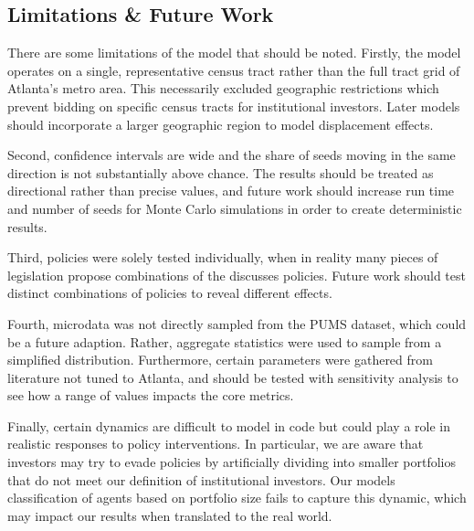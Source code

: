 \documentclass[twocolumn,showpacs,%
  nofootinbib,aps,superscriptaddress,%
  eqsecnum,prd,notitlepage,showkeys,10pt]{revtex4-1}
\begin{document}
\subsection{Limitations \& Future Work}

There are some limitations of the model that should be noted. Firstly, the model operates on a single, representative census tract rather than the full tract grid of Atlanta's metro area. This necessarily excluded geographic restrictions which prevent bidding on specific census tracts for institutional investors. Later models should incorporate a larger geographic region to model displacement effects. \newline

Second, confidence intervals are wide and the share of seeds moving in the same direction is not substantially above chance. The results should be treated as directional rather than precise values, and future work should increase run time and number of seeds for Monte Carlo simulations in order to create deterministic results.\newline

Third, policies were solely tested individually, when in reality many pieces of legislation propose combinations of the discusses policies. Future work should test distinct combinations of policies to reveal different effects. \newline

Fourth, microdata was not directly sampled from the PUMS dataset, which could be a future adaption. Rather, aggregate statistics were used to sample from a simplified distribution. Furthermore, certain parameters were gathered from literature not tuned to Atlanta, and should be tested with sensitivity analysis to see how a range of values impacts the core metrics. \newline

Finally, certain dynamics are difficult to model in code but could play a role in realistic responses to policy interventions. In particular, we are aware that investors may try to evade policies by artificially dividing into smaller portfolios that do not meet our definition of institutional investors. Our models classification of agents based on portfolio size fails to capture this dynamic, which may impact our results when translated to the real world. \newline
\end{document}
